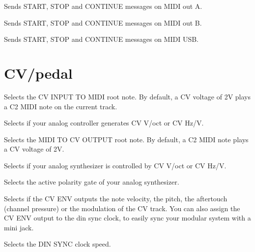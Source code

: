   

Sends START, STOP and CONTINUE messages on MIDI out A.

  

Sends START, STOP and CONTINUE messages on MIDI out B.

  

Sends START, STOP and CONTINUE messages on MIDI USB.


\section{CV/pedal}

  \btn{\ldots} 

Selects the CV INPUT TO MIDI root note. By default, a CV voltage of 2V plays a C2 MIDI note on the current track.

  

Selects if your analog controller generates CV V/oct or CV Hz/V.

  \btn{\ldots} 

Selects the MIDI TO CV OUTPUT root note. By default, a C2 MIDI note plays a CV voltage of 2V.

  

Selects if your analog synthesizer is controlled by CV V/oct or CV Hz/V.

  

Selects the active polarity gate of your analog synthesizer.

     

Selects if the CV ENV outputs the note velocity, the pitch, the aftertouch (channel pressure) or the modulation of the CV track. You can also assign the CV ENV output to the din sync clock, to easily sync your modular system with a mini jack.

          

Selects the DIN SYNC clock speed.

  

